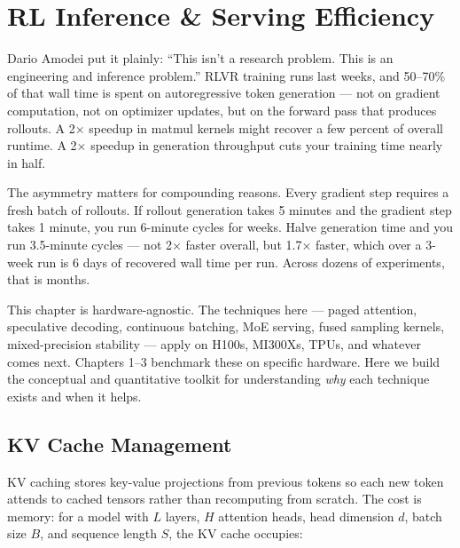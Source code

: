 \section{RL Inference \& Serving Efficiency}

\smallskip

\begin{whythis}
Dario Amodei put it plainly: ``This isn't a research problem. This is an engineering and inference problem.'' RLVR training runs last weeks, and 50--70\% of that wall time is spent on autoregressive token generation --- not on gradient computation, not on optimizer updates, but on the forward pass that produces rollouts. A 2$\times$ speedup in matmul kernels might recover a few percent of overall runtime. A 2$\times$ speedup in generation throughput cuts your training time nearly in half.

The asymmetry matters for compounding reasons. Every gradient step requires a fresh batch of rollouts. If rollout generation takes 5 minutes and the gradient step takes 1 minute, you run 6-minute cycles for weeks. Halve generation time and you run 3.5-minute cycles --- not 2$\times$ faster overall, but 1.7$\times$ faster, which over a 3-week run is 6 days of recovered wall time per run. Across dozens of experiments, that is months.

This chapter is hardware-agnostic. The techniques here --- paged attention, speculative decoding, continuous batching, MoE serving, fused sampling kernels, mixed-precision stability --- apply on H100s, MI300Xs, TPUs, and whatever comes next. Chapters 1--3 benchmark these on specific hardware. Here we build the conceptual and quantitative toolkit for understanding \textit{why} each technique exists and when it helps.
\end{whythis}

\subsection{KV Cache Management}

KV caching stores key-value projections from previous tokens so each new token attends to cached tensors rather than recomputing from scratch. The cost is memory: for a model with $L$ layers, $H$ attention heads, head dimension $d$, batch size $B$, and sequence length $S$, the KV cache occupies:

